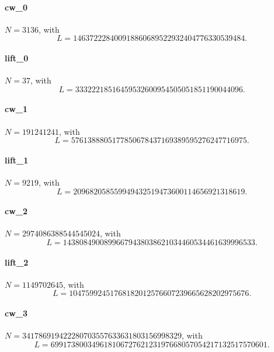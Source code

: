 \paragraph{cw\_0}
\(N=3136\), with
\[L=146372228400918860689522932404776330539484.\]
\paragraph{lift\_0}
\(N=37\), with
\[L=33322218516459532600954505051851190044096.\]
\paragraph{cw\_1}
\(N=191241241\), with
\[L=5761388805177850678437169389595276247716975.\]
\paragraph{lift\_1}
\(N=9219\), with
\[L=209682058559949432519473600114656921318619.\]
\paragraph{cw\_2}
\(N=2974086388544545024\), with
\[L=14380849008996679438038621034460534461639996533.\]
\paragraph{lift\_2}
\(N=1149702645\), with
\[L=10475992451768182012576607239665628202975676.\]
\paragraph{cw\_3}
\(N=341786919422280703557633631803156998329\), with
\[L=69917380034961810672762123197668057054217132517570601.\]
